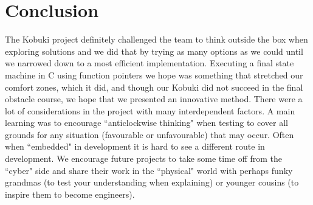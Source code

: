 \section{Conclusion}
The Kobuki project definitely challenged the team to think outside the box when exploring solutions and we did that by trying as many options as we could until we narrowed down to a most efficient implementation. Executing a final state machine in C using function pointers we hope was something that stretched our comfort zones, which it did, and though our Kobuki did not succeed in the final obstacle course, we hope that we presented an innovative method. There were a lot of considerations in the project with many interdependent factors. A main learning was to encourage ``anticlockwise thinking" when testing to cover all grounds for any situation (favourable or unfavourable) that may occur. Often when ``embedded" in development it is hard to see a different route in development. We encourage future projects to take some time off from the ``cyber" side and share their work in the ``physical" world with perhaps funky grandmas (to test your understanding when explaining) or younger cousins (to inspire them to become engineers).


